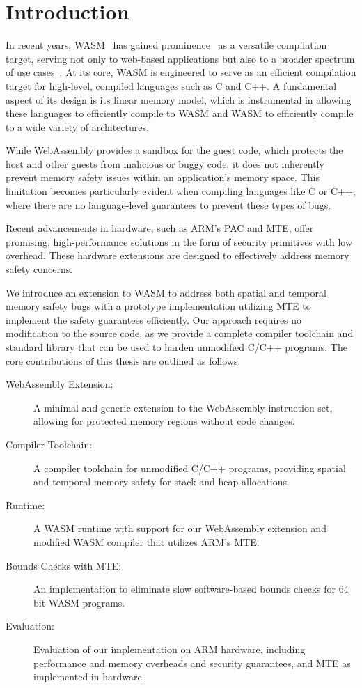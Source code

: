 \chapter{Introduction}
\label{ch:intro}

In recent years, \ac{WASM}~\cite{haas2017bringing} has gained prominence~\cite{musch2019new} as a versatile compilation target, serving not only to web-based applications but also to a broader spectrum of use cases~\cite{wasm_use_cases}.
At its core, \ac{WASM} is engineered to serve as an efficient compilation target for high-level, compiled languages such as C and C++.
A fundamental aspect of its design is its linear memory model, which is instrumental in allowing these languages to efficiently compile to \ac{WASM} and \ac{WASM} to efficiently compile to a wide variety of architectures.

While WebAssembly provides a sandbox for the guest code, which protects the host and other guests from malicious or buggy code, it does not inherently prevent memory safety issues within an application's memory space.
This limitation becomes particularly evident when compiling languages like C or C++, where there are no language-level guarantees to prevent these types of bugs.

Recent advancements in hardware, such as ARM's \ac{PAC} and \acf{MTE}, offer promising, high-performance solutions in the form of security primitives with low overhead.
These hardware extensions are designed to effectively address memory safety concerns.

We introduce an extension to \ac{WASM} to address both spatial and temporal memory safety bugs with a prototype implementation utilizing \ac{MTE} to implement the safety guarantees efficiently.
Our approach requires no modification to the source code, as we provide a complete compiler toolchain and standard library that can be used to harden unmodified C/C++ programs.
The core contributions of this thesis are outlined as follows:

\begin{description}
    \item[WebAssembly Extension:] A minimal and generic extension to the WebAssembly instruction set, allowing for protected memory regions without code changes.
    \item[Compiler Toolchain:] A compiler toolchain for unmodified C/C++ programs, providing spatial and temporal memory safety for stack and heap allocations.
    \item[Runtime:] A \ac{WASM} runtime with support for our WebAssembly extension and modified \ac{WASM} compiler that utilizes ARM's \ac{MTE}.
    \item[Bounds Checks with \ac{MTE}:] An implementation to eliminate slow software-based bounds checks for 64\,bit \ac{WASM} programs.
    \item[Evaluation:] Evaluation of our implementation on ARM hardware, including performance and memory overheads and security guarantees, and \ac{MTE} as implemented in hardware.
\end{description}
